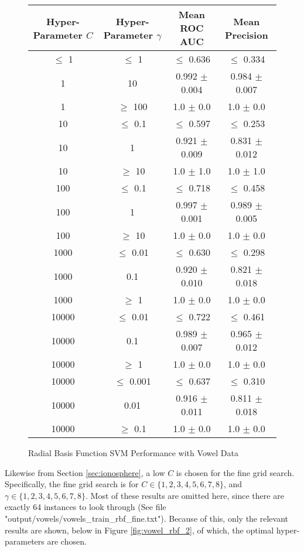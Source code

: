 \documentclass[tikz]{article}
\begin{document}
\begin{figure}[H]
\centering
\begin{tabular}{|c|c|c|c|}
\hline
Hyper-Parameter $C$ & Hyper-Parameter $\gamma$ & Mean ROC AUC & Mean Precision \\
\hline
$\leq$ 1 & $\leq$ 1 & $\leq$ 0.636  & $\leq$ 0.334 \\
\hline
1 & 10 & 0.992 $\pm$ 0.004 & 0.984 $\pm$ 0.007 \\
\hline
1 & $\geq$ 100 & 1.0 $\pm$ 0.0 & 1.0 $\pm$ 0.0 \\
\hline
10 & $\leq$ 0.1 & $\leq$ 0.597 & $\leq$ 0.253 \\
\hline
10 & 1 & 0.921 $\pm$ 0.009 & 0.831 $\pm$ 0.012 \\
\hline
10 & $\geq$ 10 & 1.0 $\pm$ 1.0 & 1.0 $\pm$ 1.0 \\
\hline
100 & $\leq$ 0.1 & $\leq$ 0.718 & $\leq$ 0.458 \\
\hline
100 & 1 & 0.997 $\pm$ 0.001 & 0.989 $\pm$ 0.005 \\
\hline
100 & $\geq$ 10 & 1.0 $\pm$ 0.0 & 1.0 $\pm$ 0.0 \\
\hline
1000 & $\leq$ 0.01 & $\leq$ 0.630 & $\leq$ 0.298 \\
\hline
1000 & 0.1 & 0.920 $\pm$ 0.010 & 0.821 $\pm$ 0.018 \\
\hline
1000 & $\geq$ 1 & 1.0 $\pm$ 0.0 & 1.0 $\pm$ 0.0 \\
\hline
10000 & $\leq$ 0.01 & $\leq$ 0.722 & $\leq$ 0.461 \\
\hline
10000 & 0.1 & 0.989 $\pm$ 0.007 & 0.965 $\pm$ 0.012 \\
\hline
10000 & $\geq$ 1 & 1.0 $\pm$ 0.0 & 1.0 $\pm$ 0.0 \\
\hline
10000 & $\leq$ 0.001 & $\leq$ 0.637 & $\leq$ 0.310 \\
\hline
10000 & 0.01 & 0.916 $\pm$ 0.011 & 0.811 $\pm$ 0.018 \\
\hline
10000 & $\geq$ 0.1 & 1.0 $\pm$ 0.0 & 1.0 $\pm$ 0.0 \\
\hline
\end{tabular}
\caption{Radial Basis Function SVM Performance with Vowel Data}
\label{fig:vowel_rbf_1}
\end{figure}

Likewise from Section \ref{sec:ionosphere}, a low $C$ is chosen for the fine grid search. Specifically, the fine grid search is for $C \in \{1, 2, 3, 4, 5, 6, 7, 8\}$, and $\gamma \in \{1, 2, 3, 4, 5, 6, 7, 8\}$. Most of these results are omitted here, since there are exactly 64 instances to look through (See file "output/vowels/vowels\_train\_rbf\_fine.txt"). Because of this, only the relevant results are shown, below in Figure \ref{fig:vowel_rbf_2}, of which, the optimal hyper-parameters are chosen.
\end{document}
